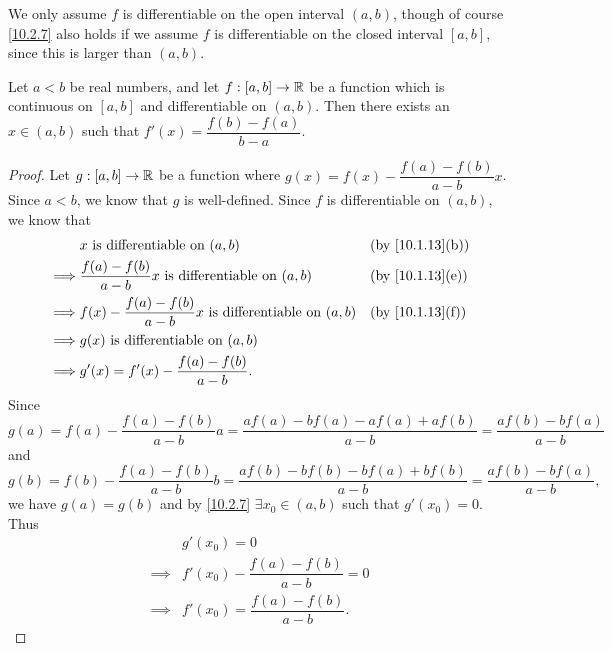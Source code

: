 \begin{rmk}\label{10.2.8}
  We only assume \(f\) is differentiable on the open interval \((a, b)\), though of course \cref{10.2.7} also holds if we assume \(f\) is differentiable on the closed interval \([a, b]\), since this is larger than \((a, b)\).
\end{rmk}

\begin{cor}\label{10.2.9}
  Let \(a < b\) be real numbers, and let \(f : [a, b] \to \mathbb{R}\) be a function which is continuous on \([a, b]\) and differentiable on \((a, b)\).
  Then there exists an \(x \in (a, b)\) such that \(f'(x) = \dfrac{f(b) - f(a)}{b - a}\).
\end{cor}

\begin{proof}
  Let \(g : [a, b] \to \mathbb{R}\) be a function where \(g(x) = f(x) - \dfrac{f(a) - f(b)}{a - b} x\).
  Since \(a < b\), we know that \(g\) is well-defined.
  Since \(f\) is differentiable on \((a, b)\), we know that
  \begin{align*}
             & x \text{ is differentiable on } (a, b)                                   &  & \text{(by \cref{10.1.13}(b))} \\
    \implies & \dfrac{f(a) - f(b)}{a - b} x \text{ is differentiable on } (a, b)        &  & \text{(by \cref{10.1.13}(e))} \\
    \implies & f(x) - \dfrac{f(a) - f(b)}{a - b} x \text{ is differentiable on } (a, b) &  & \text{(by \cref{10.1.13}(f))} \\
    \implies & g(x) \text{ is differentiable on } (a, b)                                                                   \\
    \implies & g'(x) = f'(x) - \dfrac{f(a) - f(b)}{a - b}.
  \end{align*}
  Since
  \[
    g(a) = f(a) - \dfrac{f(a) - f(b)}{a - b} a = \dfrac{af(a) - bf(a) - af(a) + af(b)}{a - b} = \dfrac{af(b) - bf(a)}{a - b}
  \]
  and
  \[
    g(b) = f(b) - \dfrac{f(a) - f(b)}{a - b} b = \dfrac{af(b) - bf(b) - bf(a) + bf(b)}{a - b} = \dfrac{af(b) - bf(a)}{a - b},
  \]
  we have \(g(a) = g(b)\) and by \cref{10.2.7} \(\exists x_0 \in (a, b)\) such that \(g'(x_0) = 0\).
  Thus
  \begin{align*}
             & g'(x_0) = 0                              \\
    \implies & f'(x_0) - \dfrac{f(a) - f(b)}{a - b} = 0 \\
    \implies & f'(x_0) = \dfrac{f(a) - f(b)}{a - b}.
  \end{align*}
\end{proof}

